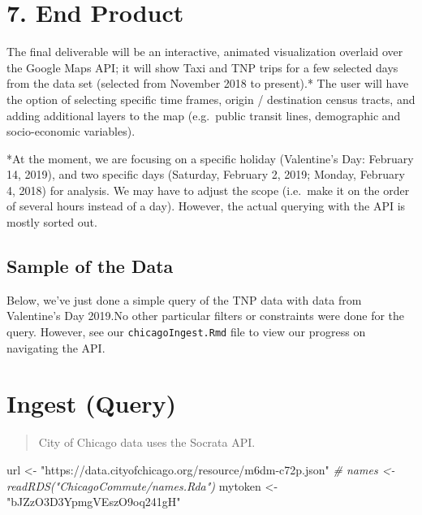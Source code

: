\documentclass[]{article}
\newenvironment{Shaded}{\begin{snugshade}}{\end{snugshade}}
\newcommand{\CommentTok}[1]{\textcolor[rgb]{0.56,0.35,0.01}{\textit{#1}}}
\newcommand{\NormalTok}[1]{#1}
\newcommand{\StringTok}[1]{\textcolor[rgb]{0.31,0.60,0.02}{#1}}
\begin{document}
\hypertarget{end-product}{%
\section{7. End Product}\label{end-product}}

The final deliverable will be an interactive, animated visualization
overlaid over the Google Maps API; it will show Taxi and TNP trips for a
few selected days from the data set (selected from November 2018 to
present).* The user will have the option of selecting specific time
frames, origin / destination census tracts, and adding additional layers
to the map (e.g.~public transit lines, demographic and socio-economic
variables).

*At the moment, we are focusing on a specific holiday (Valentine's Day:
February 14, 2019), and two specific days (Saturday, February 2, 2019;
Monday, February 4, 2018) for analysis. We may have to adjust the scope
(i.e.~make it on the order of several hours instead of a day). However,
the actual querying with the API is mostly sorted out.

\hypertarget{sample-of-the-data}{%
\subsection{Sample of the Data}\label{sample-of-the-data}}

Below, we've just done a simple query of the TNP data with data from
Valentine's Day 2019.No other particular filters or constraints were
done for the query. However, see our \texttt{chicagoIngest.Rmd} file to
view our progress on navigating the API.

\hypertarget{ingest-query}{%
\section{Ingest (Query)}\label{ingest-query}}

\begin{quote}
City of Chicago data uses the Socrata API.
\end{quote}

\begin{Shaded}
\begin{Highlighting}[]
\NormalTok{url <-}\StringTok{ "https://data.cityofchicago.org/resource/m6dm-c72p.json"}
\CommentTok{# names <- readRDS("ChicagoCommute/names.Rda")}
\NormalTok{mytoken <-}\StringTok{ "bJZzO3D3YpmgVEszO9oq241gH"}
\end{Highlighting}
\end{Shaded}
\end{document}
